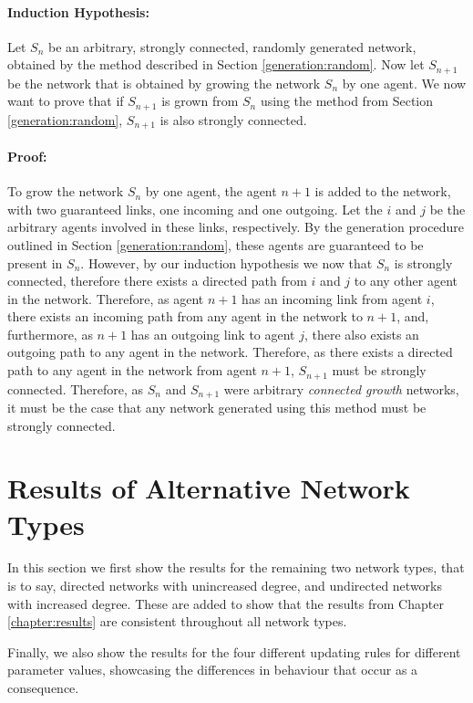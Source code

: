 \documentclass[a4paper, 12pt]{report}
\begin{document}
\paragraph{Induction Hypothesis:}
Let $S_n$ be an arbitrary, strongly connected, randomly generated network, obtained by the method described in Section \ref{generation:random}. Now let $S_{n+1}$ be the network that is obtained by growing the network $S_n$ by one agent. We now want to prove that if $S_{n+1}$ is grown from $S_n$ using the method from Section \ref{generation:random}, $S_{n+1}$ is also strongly connected.

\paragraph{Proof:} To grow the network $S_n$ by one agent, the agent $n+1$ is added to the network, with two guaranteed links, one incoming and one outgoing. Let the $i$ and $j$ be the arbitrary agents involved in these links, respectively. By the generation procedure outlined in Section \ref{generation:random}, these agents are guaranteed to be present in $S_n$. However, by our induction hypothesis we now that $S_n$ is strongly connected, therefore there exists a directed path from $i$ and $j$ to any other agent in the network. Therefore, as agent $n+1$ has an incoming link from agent $i$, there exists an incoming path from any agent in the network to $n+1$, and, furthermore, as $n+1$ has an outgoing link to agent $j$, there also exists an outgoing path to any agent in the network. Therefore, as there exists a directed path to any agent in the network from agent $n+1$, $S_{n+1}$ must be strongly connected.\newline
Therefore, as $S_n$ and $S_{n+1}$ were arbitrary \emph{connected growth} networks, it must be the case that any network generated using this method must be strongly connected.\newline

\section{Results of Alternative Network Types}
\label{results:appendix}
In this section we first show the results for the remaining two network types, that is to say, directed networks with unincreased degree, and undirected networks with increased degree. These are added to show that the results from Chapter \ref{chapter:results} are consistent throughout all network types.

Finally, we also show the results for the four different updating rules for different parameter values, showcasing the differences in behaviour that occur as a consequence.
\end{document}
